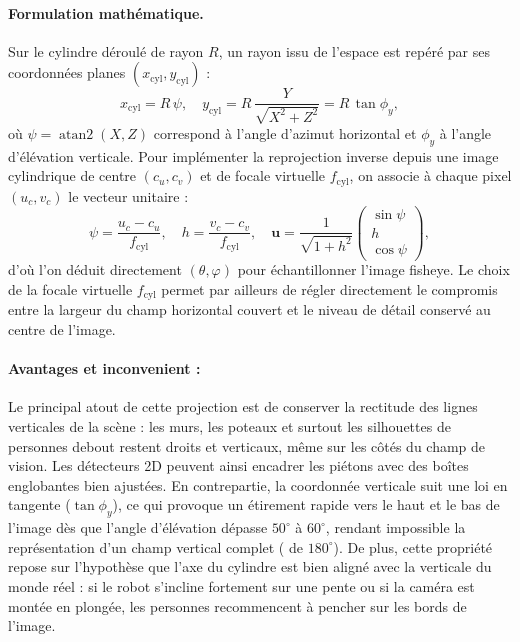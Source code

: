 \documentclass[11pt,a4paper]{article}
\begin{document}
\paragraph{Formulation mathématique.}
Sur le cylindre déroulé de rayon $R$, un rayon issu de l'espace est repéré par ses coordonnées planes $(x_{\text{cyl}}, y_{\text{cyl}})$ :
\begin{equation}
x_{\text{cyl}} = R\,\psi, \quad y_{\text{cyl}} = R\,\frac{Y}{\sqrt{X^2 + Z^2}} = R\,\tan \phi_y,
\end{equation}
où $\psi = \operatorname{atan2}(X, Z)$ correspond à l'angle d'azimut horizontal et $\phi_y$ à l'angle d'élévation verticale. Pour implémenter la reprojection inverse depuis une image cylindrique de centre $(c_u, c_v)$ et de focale virtuelle $f_{\text{cyl}}$, on associe à chaque pixel $(u_c, v_c)$ le vecteur unitaire :
\begin{equation}
\psi = \frac{u_c - c_u}{f_{\text{cyl}}}, \quad h = \frac{v_c - c_v}{f_{\text{cyl}}}, \quad \mathbf{u} = \frac{1}{\sqrt{1 + h^2}}\begin{pmatrix} \sin\psi \\ h \\ \cos\psi \end{pmatrix},
\end{equation}
d'où l'on déduit directement $(\theta, \varphi)$ pour échantillonner l'image fisheye. Le choix de la focale virtuelle $f_{\text{cyl}}$ permet par ailleurs de régler directement le compromis entre la largeur du champ horizontal couvert et le niveau de détail conservé au centre de l'image.

\paragraph{Avantages et inconvenient :}
Le principal atout de cette projection est de conserver la rectitude des lignes verticales de la scène : les murs, les poteaux et surtout les silhouettes de personnes debout restent droits et verticaux, même sur les côtés du champ de vision. Les détecteurs 2D peuvent ainsi encadrer les piétons avec des boîtes englobantes bien ajustées. En contrepartie, la coordonnée verticale suit une loi en tangente ($\tan \phi_y$), ce qui provoque un étirement rapide vers le haut et le bas de l'image dès que l'angle d'élévation dépasse $50^\circ$ à $60^\circ$, rendant impossible la représentation d'un champ vertical complet ( de $180^\circ$). De plus, cette propriété repose sur l'hypothèse que l'axe du cylindre est bien aligné avec la verticale du monde réel : si le robot s'incline fortement sur une pente ou si la caméra est montée en plongée, les personnes recommencent à pencher sur les bords de l'image.
\end{document}
